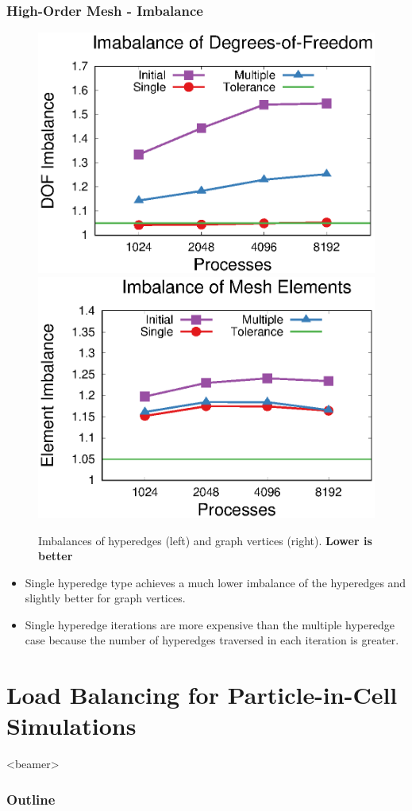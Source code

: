 \documentclass[aspectratio=169]{beamer}
\newcommand{\outline}{
  \begin{frame}<beamer>
    \frametitle{Outline}
    \tableofcontents[currentsection]
  \end{frame}
}
\begin{document}
\begin{frame}
  \frametitle{High-Order Mesh - Imbalance}
  \begin{figure}[!ht]
    \centering
    \includegraphics[width=.47\linewidth]{dof_v_cores.eps}
    \includegraphics[width=.47\linewidth]{elm_v_cores.eps}
    \caption*{Imbalances of hyperedges (left) and graph vertices (right). \bf Lower is better}
  \end{figure}
  \vspace{.3cm}
  \begin{itemize}
  \item Single hyperedge type achieves a much lower imbalance of the hyperedges and slightly better for graph vertices.
  \item Single hyperedge iterations are more expensive than the multiple hyperedge case because the number of hyperedges traversed in each iteration is greater.
  \end{itemize}
\end{frame}

\section{Load Balancing for Particle-in-Cell Simulations}
\outline
\end{document}
